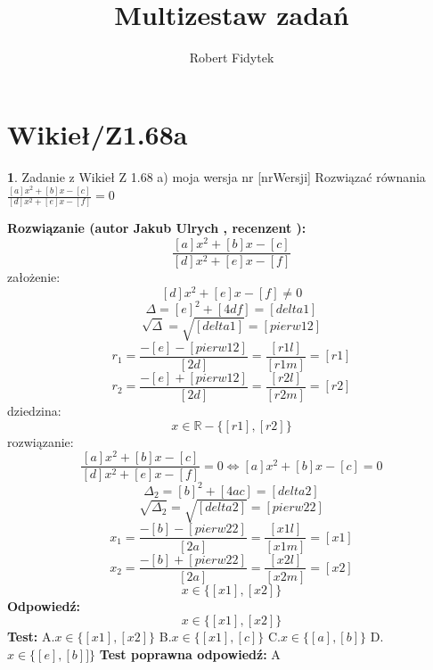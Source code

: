 \documentclass[12pt, a4paper]{article}
\title{Multizestaw zadań}
\author{Robert Fidytek}
\date{}
\theoremstyle{definition} %
\newtheorem{zad}{}
\newcommand{\kategoria}[1]{\section{#1}} %
\newcommand{\zadStart}[1]{\begin{zad}#1\newline} %
\newcommand{\zadStop}{\end{zad}}   %
\newcommand{\rozwStart}[2]{\noindent \textbf{Rozwiązanie (autor #1 , recenzent #2): }\newline} %
\newcommand{\rozwStop}{\newline}                                            %
\newcommand{\odpStart}{\noindent \textbf{Odpowiedź:}\newline}    %
\newcommand{\odpStop}{\newline}                                             %
\newcommand{\testStart}{\noindent \textbf{Test:}\newline} %
\newcommand{\testStop}{\newline} %
\newcommand{\kluczStart}{\noindent \textbf{Test poprawna odpowiedź:}\newline} %
\newcommand{\kluczStop}{\newline} %
\begin{document}
\maketitle


\kategoria{Wikieł/Z1.68a}
\zadStart{Zadanie z Wikieł Z 1.68 a) moja wersja nr [nrWersji]}
Rozwiązać równania $\frac{[a]x^{2}+[b]x-[c]}{[d]x^{2}+[e]x-[f]}=0$
\zadStop
\rozwStart{Jakub Ulrych}{}
$$\frac{[a]x^{2}+[b]x-[c]}{[d]x^{2}+[e]x-[f]}$$
założenie:$$[d]x^{2}+[e]x-[f]\neq0$$
$$\Delta=[e]^{2}+[4df]=[delta1]$$
$$\sqrt{\Delta}=\sqrt{[delta1]}=[pierw12]$$
$$r_{1}=\frac{-[e]-[pierw12]}{[2d]}=\frac{[r1l]}{[r1m]}=[r1]$$
$$r_{2}=\frac{-[e]+[pierw12]}{[2d]}=\frac{[r2l]}{[r2m]}=[r2]$$
dziedzina:$$x\in\mathbb{R}-\{[r1],[r2]\}$$
rozwiązanie:$$\frac{[a]x^{2}+[b]x-[c]}{[d]x^{2}+[e]x-[f]}=0\Leftrightarrow[a]x^{2}+[b]x-[c]=0$$
$$\Delta_{2}=[b]^{2}+[4ac]=[delta2]$$
$$\sqrt{\Delta_{2}}=\sqrt{[delta2]}=[pierw22]$$
$$x_{1}=\frac{-[b]-[pierw22]}{[2a]}=\frac{[x1l]}{[x1m]}=[x1]$$
$$x_{2}=\frac{-[b]+[pierw22]}{[2a]}=\frac{[x2l]}{[x2m]}=[x2]$$
$$x\in\{[x1],[x2]\}$$
\rozwStop
\odpStart
$$x\in\{[x1],[x2]\}$$
\odpStop
\testStart
A.$x\in\{[x1],[x2]\}$
B.$x\in\{[x1],[c]\}$
C.$x\in\{[a],[b]\}$
D.$x\in\{[e],[b]]\}$
\testStop
\kluczStart
A
\kluczStop
\end{document}

